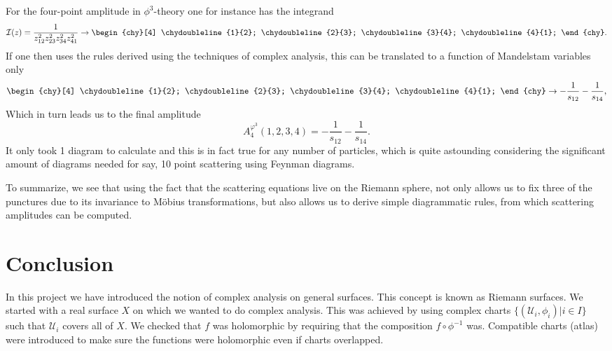 \documentclass[lettersize,12pt]{article}
\begin{document}
For the four-point amplitude in $\phi^3$-theory one for instance has the integrand
\begin{equation} \label{eq:4pt-ex}
	\mathcal{I}(z)=\frac{1}{z_{12}^2z_{23}^2z_{34}^2z_{41}^2}\to
	\begin{chy}[4]
		\chydoubleline{1}{2};
		\chydoubleline{2}{3};
		\chydoubleline{3}{4};
		\chydoubleline{4}{1};
	\end{chy}.
\end{equation}
If one then uses the rules derived using the techniques of complex analysis, this can be translated to a function of Mandelstam variables only
\begin{equation} \label{eq:4pt-expr}
	\begin{chy}[4]
		\chydoubleline{1}{2};
		\chydoubleline{2}{3};
		\chydoubleline{3}{4};
		\chydoubleline{4}{1};
	\end{chy}
	\to
	-\frac{1}{s_{12}}-\frac{1}{s_{14}},
\end{equation}
Which in turn leads us to the final amplitude
\begin{equation}
	A_4^{\varphi^3}(1,2,3,4)=-\frac{1}{s_{12}}-\frac{1}{s_{14}}.
\end{equation}
It only took 1 diagram to calculate and this is in fact true for any number of particles, which is quite astounding considering the significant amount of diagrams needed for say, 10 point scattering using Feynman diagrams. 

To summarize, we see that using the fact that the scattering equations live on the Riemann sphere, not only allows us to fix three of the punctures due to its invariance to Möbius transformations, but also allows us to derive simple diagrammatic rules, from which scattering amplitudes can be computed.
\section{Conclusion}
In this project we have introduced the notion of complex analysis on general surfaces. This concept is known as Riemann surfaces. We started with a real surface $X$ on which we wanted to do complex analysis. This was achieved by using complex charts $\{(\mathcal{U}_i,\phi_i)\big|i\in I\}$ such that $\mathcal{U}_i$ covers all of $X$. We checked that $f$ was holomorphic by requiring that the composition $f\circ \phi^{-1}$ was. Compatible charts (atlas) were introduced to make sure the functions were holomorphic even if charts overlapped.
\end{document}
